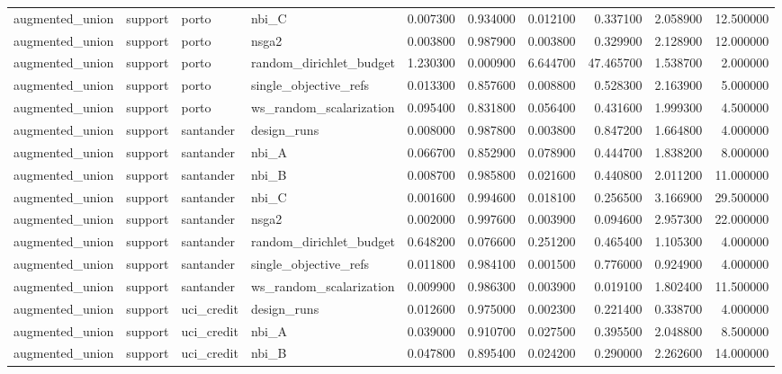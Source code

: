 \begin{landscape}
\begin{longtable}{llllrrrrrr}
augmented\_union & support & porto & nbi\_C & 0.007300 & 0.934000 & 0.012100 & 0.337100 & 2.058900 & 12.500000 \\
augmented\_union & support & porto & nsga2 & 0.003800 & 0.987900 & 0.003800 & 0.329900 & 2.128900 & 12.000000 \\
augmented\_union & support & porto & random\_dirichlet\_budget & 1.230300 & 0.000900 & 6.644700 & 47.465700 & 1.538700 & 2.000000 \\
augmented\_union & support & porto & single\_objective\_refs & 0.013300 & 0.857600 & 0.008800 & 0.528300 & 2.163900 & 5.000000 \\
augmented\_union & support & porto & ws\_random\_scalarization & 0.095400 & 0.831800 & 0.056400 & 0.431600 & 1.999300 & 4.500000 \\
augmented\_union & support & santander & design\_runs & 0.008000 & 0.987800 & 0.003800 & 0.847200 & 1.664800 & 4.000000 \\
augmented\_union & support & santander & nbi\_A & 0.066700 & 0.852900 & 0.078900 & 0.444700 & 1.838200 & 8.000000 \\
augmented\_union & support & santander & nbi\_B & 0.008700 & 0.985800 & 0.021600 & 0.440800 & 2.011200 & 11.000000 \\
augmented\_union & support & santander & nbi\_C & 0.001600 & 0.994600 & 0.018100 & 0.256500 & 3.166900 & 29.500000 \\
augmented\_union & support & santander & nsga2 & 0.002000 & 0.997600 & 0.003900 & 0.094600 & 2.957300 & 22.000000 \\
augmented\_union & support & santander & random\_dirichlet\_budget & 0.648200 & 0.076600 & 0.251200 & 0.465400 & 1.105300 & 4.000000 \\
augmented\_union & support & santander & single\_objective\_refs & 0.011800 & 0.984100 & 0.001500 & 0.776000 & 0.924900 & 4.000000 \\
augmented\_union & support & santander & ws\_random\_scalarization & 0.009900 & 0.986300 & 0.003900 & 0.019100 & 1.802400 & 11.500000 \\
augmented\_union & support & uci\_credit & design\_runs & 0.012600 & 0.975000 & 0.002300 & 0.221400 & 0.338700 & 4.000000 \\
augmented\_union & support & uci\_credit & nbi\_A & 0.039000 & 0.910700 & 0.027500 & 0.395500 & 2.048800 & 8.500000 \\
augmented\_union & support & uci\_credit & nbi\_B & 0.047800 & 0.895400 & 0.024200 & 0.290000 & 2.262600 & 14.000000 \\

\end{longtable}
\end{landscape}
